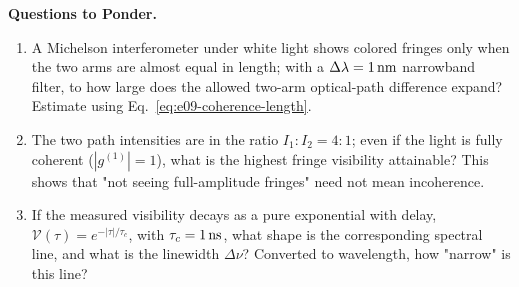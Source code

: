 \medskip
\noindent\textbf{Questions to Ponder.}
\begin{enumerate}
  \item A Michelson interferometer under white light shows colored fringes only when the two arms are almost equal in length; with a \(\Delta\lambda=1\,{\rm nm}\) narrowband filter, to how large does the allowed two-arm optical-path difference expand? Estimate using Eq.~\eqref{eq:e09-coherence-length}.
  \item The two path intensities are in the ratio \(I_1:I_2=4:1\); even if the light is fully coherent (\(|g^{(1)}|=1\)), what is the highest fringe visibility attainable? This shows that "not seeing full-amplitude fringes" need not mean incoherence.
  \item If the measured visibility decays as a pure exponential with delay, \(\mathcal V(\tau)=e^{-|\tau|/\tau_c}\), with \(\tau_c=1\,{\rm ns}\), what shape is the corresponding spectral line, and what is the linewidth \(\Delta\nu\)? Converted to wavelength, how "narrow" is this line?
\end{enumerate}
